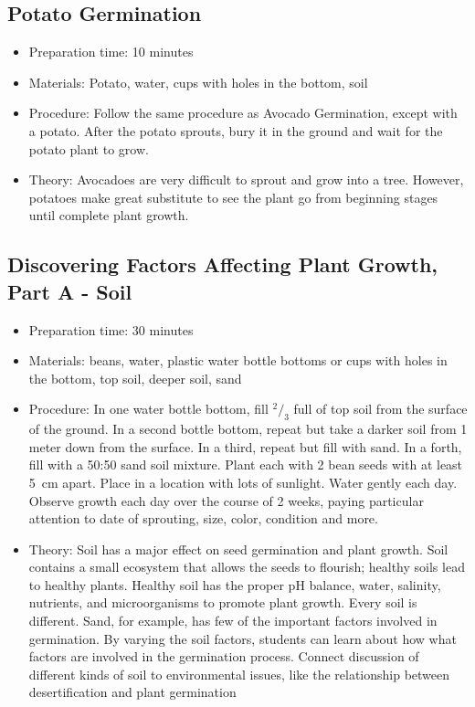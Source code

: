 \subsection{Potato Germination}
\begin{itemize}
\item{Preparation time: 10 minutes}
\item{Materials: Potato, water, cups with holes in the bottom, soil}
\item{Procedure: Follow the same procedure as Avocado Germination, except with a potato. After the potato sprouts, bury it in the ground and wait for the potato plant to grow.}
\item{Theory: Avocadoes are very difficult to sprout and grow into a tree. However, potatoes make great substitute to see the plant go from beginning stages until complete plant growth.}
\end{itemize}

\subsection{Discovering Factors Affecting Plant Growth, Part A - Soil}
\begin{itemize}
\item{Preparation time: 30 minutes}
\item{Materials: beans, water, plastic water bottle bottoms or cups with holes in the bottom, top soil, deeper soil, sand}
\item{Procedure: In one water bottle bottom, fill $^2/_3$ full of top soil from the surface of the ground. In a second bottle bottom, repeat but take a darker soil from 1 meter down from the surface. In a third, repeat but fill with sand. In a forth, fill with a 50:50 sand soil mixture. Plant each with 2 bean seeds with at least 5~cm apart. Place in a location with lots of sunlight. Water gently each day. Observe growth each day over the course of 2 weeks, paying particular attention to date of sprouting, size, color, condition and more.}
\item{Theory: Soil has a major effect on seed germination and plant growth. Soil contains a small ecosystem that allows the seeds to flourish; healthy soils lead to healthy plants. Healthy soil has the proper pH balance, water, salinity, nutrients, and microorganisms to promote plant growth. Every soil is different. Sand, for example, has few of the important factors involved in germination. By varying the soil factors, students can learn about how what factors are involved in the germination process. Connect discussion of different kinds of soil to environmental issues, like the relationship between desertification and plant germination}
\end{itemize}

